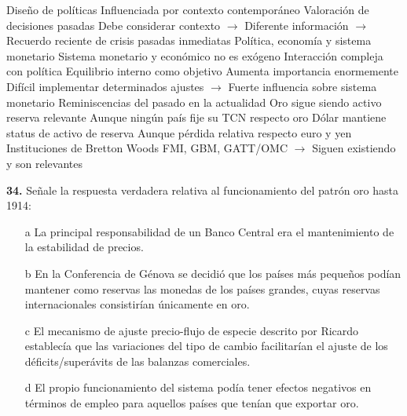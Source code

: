 \documentclass{nuevotema}
\begin{document}
\begin{esquemal}
				\4 Diseño de políticas
				\4[] Influenciada por contexto contemporáneo
				\4 Valoración de decisiones pasadas
				\4[] Debe considerar contexto
				\4[] $\to$ Diferente información
				\4[] $\to$ Recuerdo reciente de crisis pasadas inmediatas
			\3 Política, economía y sistema monetario
				\4 Sistema monetario y económico no es exógeno
				\4[] Interacción compleja con política
				\4 Equilibrio interno como objetivo
				\4[] Aumenta importancia enormemente
				\4[] Difícil implementar determinados ajustes
				\4[] $\to$ Fuerte influencia sobre sistema monetario
			\3 Reminiscencias del pasado en la actualidad
				\4 Oro sigue siendo activo reserva relevante
				\4[] Aunque ningún país fije su TCN respecto oro
				\4 Dólar mantiene status de activo de reserva
				\4[] Aunque pérdida relativa respecto euro y yen
				\4 Instituciones de Bretton Woods
				\4[] FMI, GBM, GATT/OMC
				\4[] $\to$ Siguen existiendo y son relevantes
\end{esquemal}


























\preguntas

\textbf{34.} Señale la respuesta verdadera relativa al funcionamiento del patrón oro hasta 1914:

\begin{itemize}
	\item[a] La principal responsabilidad de un Banco Central era el mantenimiento de la estabilidad de precios.
	\item[b] En la Conferencia de Génova se decidió que los países más pequeños podían mantener como reservas las monedas de los países grandes, cuyas reservas internacionales consistirían únicamente en oro.
	\item[c] El mecanismo de ajuste precio-flujo de especie descrito por Ricardo establecía que las variaciones del tipo de cambio facilitarían el ajuste de los déficits/superávits de las balanzas comerciales.
	\item[d] El propio funcionamiento del sistema podía tener efectos negativos en términos de empleo para aquellos países que tenían que exportar oro. 
\end{itemize} 
\end{document}
